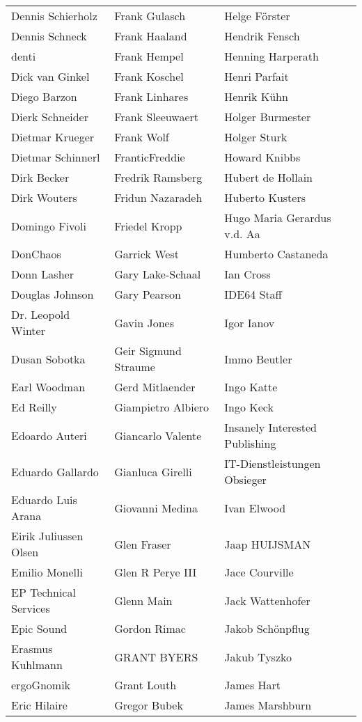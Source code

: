 \begin{tabular}{p{4cm}p{4cm}p{4cm}}
Dennis Schierholz & Frank Gulasch & Helge Förster \\
Dennis Schneck & Frank Haaland & Hendrik Fensch \\
denti & Frank Hempel & Henning Harperath \\
Dick van Ginkel & Frank Koschel & Henri Parfait \\
Diego Barzon & Frank Linhares & Henrik Kühn \\
Dierk Schneider & Frank Sleeuwaert & Holger Burmester \\
Dietmar Krueger & Frank Wolf & Holger Sturk \\
Dietmar Schinnerl & FranticFreddie & Howard Knibbs \\
Dirk Becker & Fredrik Ramsberg & Hubert de Hollain \\
Dirk Wouters & Fridun Nazaradeh & Huberto Kusters \\
Domingo Fivoli & Friedel Kropp & Hugo Maria Gerardus v.d. Aa \\
DonChaos & Garrick West & Humberto Castaneda \\
Donn Lasher & Gary Lake-Schaal & Ian Cross \\
Douglas Johnson & Gary Pearson & IDE64 Staff \\
Dr. Leopold Winter & Gavin Jones & Igor Ianov \\
Dusan Sobotka & Geir Sigmund Straume & Immo Beutler \\
Earl Woodman & Gerd Mitlaender & Ingo Katte \\
Ed Reilly & Giampietro Albiero & Ingo Keck \\
Edoardo Auteri & Giancarlo Valente & Insanely Interested Publishing \\
Eduardo Gallardo & Gianluca Girelli & IT-Dienstleistungen Obsieger \\
Eduardo Luis Arana & Giovanni Medina & Ivan Elwood \\
Eirik Juliussen Olsen & Glen Fraser & Jaap HUIJSMAN \\
Emilio Monelli & Glen R Perye III & Jace Courville \\
EP Technical Services & Glenn Main & Jack Wattenhofer \\
Epic Sound & Gordon Rimac & Jakob Schönpflug \\
Erasmus Kuhlmann & GRANT BYERS & Jakub Tyszko \\
ergoGnomik & Grant Louth & James Hart \\
Eric Hilaire & Gregor Bubek & James Marshburn \\

\end{tabular}

